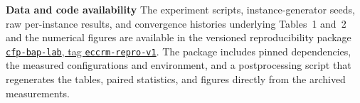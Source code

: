 \noindent\textbf{Data and code availability}\quad
The experiment scripts, instance-generator seeds, raw per-instance results,
and convergence histories underlying Tables~1 and~2 and the numerical
figures are available in the versioned reproducibility package
\href{https://github.com/pabl0ck/cfp-bap-lab/tree/eccrm-repro-v1}
{\texttt{cfp-bap-lab}, tag \texttt{eccrm-repro-v1}}.
The package includes pinned dependencies, the measured configurations and
environment, and a postprocessing script that regenerates the tables,
paired statistics, and figures directly from the archived measurements.
